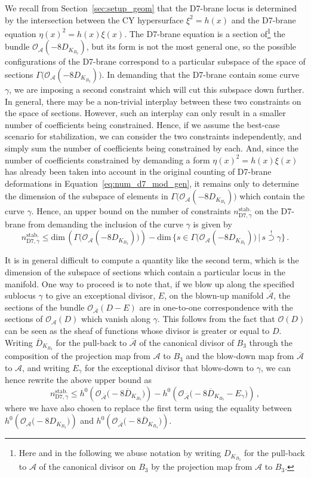 \documentclass[a4paper,12pt]{article}
\numberwithin{equation}{section}
\newcommand{\mc}{\mathcal}
\newcommand{\be}{\begin{equation}}
\newcommand{\ee}{\end{equation}}
\newcommand{\fthb}{B_3}				%
\newcommand{\cand}[1]{D_{K_{#1}}}		%
\newcommand{\candl}{\overline{D}_{K_{B_3}}}	%
\newcommand{\as}{\mc{A}}				%
\newcommand{\asl}{\overline{\mc{A}}}	%
\newcommand{\crv}{\gamma}			%
\newcommand{\stbmod}[1]{n_{\mathrm{D7},{#1}}^\mathrm{stab.}}		%
\begin{document}
We recall from Section~\ref{sec:setup_geom} that the D7-brane locus is determined by the intersection between the CY hypersurface $\xi^2=h(x)$ and the D7-brane equation $\eta(x)^2 = h(x)\xi(x)$. The D7-brane equation is a section of\footnote{Here and in the following we abuse notation by writing $\cand{\fthb}$ for the pull-back to $\as$ of the canonical divisor on $\fthb$ by the projection map from $\as$ to $\fthb$.} the bundle $\mc{O}_\as(-8\cand{\fthb})$, but its form is not the most general one, so the possible configurations of the D7-brane correspond to a particular subspace of the space of sections $\Gamma\big(\mc{O}_\as(-8\cand{\fthb})\big)$. In demanding that the D7-brane contain some curve $\crv$, we are imposing a second constraint which will cut this subspace down further. In general, there may be a non-trivial interplay between these two constraints on the space of sections. However, such an interplay can only result in a smaller number of coefficients being constrained. Hence, if we assume the best-case scenario for stabilization, we can consider the two constraints independently, and simply sum the number of coefficients being constrained by each. And, since the number of coefficients constrained by demanding a form $\eta(x)^2 = h(x)\xi(x)$ has already been taken into account in the original counting of D7-brane deformations in Equation~\eqref{eq:num_d7_mod_gen}, it remains only to determine the dimension of the subspace of elements in $\Gamma\big(\mc{O}_\as(-8\cand{\fthb})\big)$ which contain the curve $\crv$. Hence, an upper bound on the number of constraints $\stbmod{\crv}$ on the D7-brane from demanding the inclusion of the curve $\crv$ is given by
\be
\stbmod{\crv} \leq 
\mathrm{dim}\,\left(\Gamma\big(\mc{O}_\as(-8\cand{\fthb})\big)\right) - \mathrm{dim}\,\big\{s \in \Gamma\big(\mc{O}_\as(-8\cand{\fthb})\big) \, | \,  s \stackrel{!}{\supset} \crv \big\} \,.
\ee

It is in general difficult to compute a quantity like the second term, which is the dimension of the subspace of sections which contain a particular locus in the manifold. One way to proceed is to note that, if we blow up along the specified sublocus $\crv$ to give an exceptional divisor, $E$, on the blown-up manifold $\asl$, the sections of the bundle $\mc{O}_{\asl}(D-E)$ are in one-to-one correspondence with the sections of $\mc{O}_\as(D)$ which vanish along $\crv$. This follows from the fact that $\mc{O}(D)$ can be seen as the sheaf of functions whose divisor is greater or equal to $D$.
Writing $\candl$ for the pull-back to $\asl$ of the canonical divisor of $\fthb$ through the composition of the projection map from $\as$ to $\fthb$ and the blow-down map from $\asl$ to $\as$, and writing $E_\crv$ for the exceptional divisor that blows-down to $\crv$, we can hence rewrite the above upper bound as
\be
\stbmod{\crv} \leq h^0\left(\mc{O}_{\asl}\big(-8\candl\big)\right) - h^0\left(\mc{O}_{\asl}\big(-8\candl-E_\crv\big)\right) \,,
\ee
where we have also chosen to replace the first term using the equality between $h^0\left(\mc{O}_{\as}\big(-8\cand{\fthb}\big)\right)$ and $h^0\left(\mc{O}_{\asl}\big(-8\candl\big)\right)$.
\end{document}
